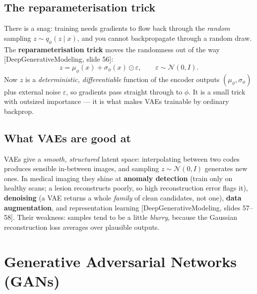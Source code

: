 \documentclass[11pt]{article}
\newcommand{\deck}[1]{\textsf{\small[#1]}}
\begin{document}
\subsection{The reparameterisation trick}

There is a snag: training needs gradients to flow back through the \emph{random}
sampling $z\sim q_\phi(z\mid x)$, and you cannot backpropagate through a random
draw. The \textbf{reparameterisation trick} moves the randomness out of the way
\deck{DeepGenerativeModeling, slide 56}:
\[
z = \mu_\phi(x) + \sigma_\phi(x)\odot\varepsilon, \qquad \varepsilon\sim\mathcal{N}(0,I).
\]
Now $z$ is a \emph{deterministic, differentiable} function of the encoder outputs
$(\mu_\phi,\sigma_\phi)$ plus external noise $\varepsilon$, so gradients pass
straight through to $\phi$. It is a small trick with outsized importance --- it is
what makes VAEs trainable by ordinary backprop.

\subsection{What VAEs are good at}

VAEs give a \emph{smooth, structured} latent space: interpolating between two
codes produces sensible in-between images, and sampling $z\sim\mathcal{N}(0,I)$
generates new ones. In medical imaging they shine at \textbf{anomaly detection}
(train only on healthy scans; a lesion reconstructs poorly, so high
reconstruction error flags it), \textbf{denoising} (a VAE returns a whole
\emph{family} of clean candidates, not one), \textbf{data augmentation}, and
representation learning \deck{DeepGenerativeModeling, slides 57--58}. Their
weakness: samples tend to be a little \emph{blurry}, because the Gaussian
reconstruction loss averages over plausible outputs.

\section{Generative Adversarial Networks (GANs)}
\end{document}
